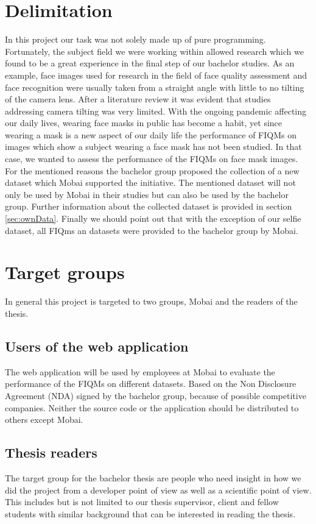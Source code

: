 \section{Delimitation}
\label{sec:delimit}
In this project our task was not solely made up of pure programming. Fortunately, the subject field we were working within allowed research which we found to be a great experience in the final step of our bachelor studies. As an example, face images used for research in the field of face quality assessment and face recognition were usually taken from a straight angle with little to no tilting of the camera lens. After a literature review it was evident that studies addressing camera tilting was very limited. With the ongoing pandemic affecting our daily lives, wearing face masks in public has become a habit, yet since wearing a mask is a new aspect of our daily life the performance of FIQMs on images which show a subject wearing a face mask has not been studied. In that case, we wanted to assess the performance of the FIQMs on face mask images. For the mentioned reasons the bachelor group proposed the collection of a new dataset which Mobai supported the initiative. The mentioned dataset will not only be used by Mobai in their studies but can also be used by the bachelor group. Further information about the collected dataset is provided in section \ref{sec:ownData}. Finally we should point out that with the exception of our selfie dataset, all FIQms an datasets were provided to the bachelor group by Mobai. 

\section{Target groups}
\label{sec:TargetGroups}
In general this project is targeted to two groups, Mobai and the readers of the thesis. 

\subsection{Users of the web application}
The web application will be used by employees at Mobai to evaluate the performance of the FIQMs on different datasets. Based on the Non Disclosure Agreement (NDA) signed by the bachelor group, because of possible competitive companies. Neither the source code or the application should be distributed to others except Mobai.

\subsection{Thesis readers}
The target group for the bachelor thesis are people who need insight in how we did the project from a developer point of view as well as a scientific point of view. This includes but is not limited to our thesis supervisor,  client and fellow students with similar background that can be interested in reading the thesis.

